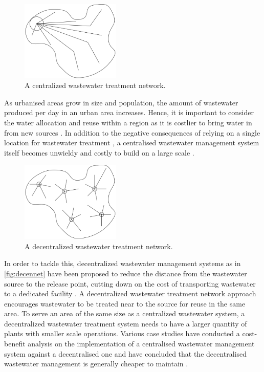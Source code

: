 \documentclass[preprint,12pt,authoryear]{elsarticle}
\begin{document}
\begin{figure}
	\begin{center}
		\includegraphics[width=0.42\textwidth]{centralizedtreatment.png}
	\end{center}
		\caption{A centralized wastewater treatment network.}
		\label{fig:cennet}
\end{figure}%
As urbanised areas grow in size and population, the amount of wastewater produced per day in an urban area increases. Hence, it is important to consider the water allocation and reuse within a region as it is costlier to bring water in from new sources \citep{gleick2000}. In addition to the negative consequences of relying on a single location for wastewater treatment \citep{wilderer2000,bakir2001}, a centralised wastewater management system itself becomes unwieldy and costly to build on a large scale \citep{wilderer2000}.


\begin{figure}
	\begin{center}
		\includegraphics[width=0.42\textwidth]{decentralizedtreatment.png}
	\end{center}
		\caption{A decentralized wastewater treatment network.}
		\label{fig:decennet}
\end{figure}
In order to tackle this, decentralized wastewater management systems as in \autoref{fig:decennet} have been proposed to reduce the distance from the wastewater source to the release point, cutting down on the cost of transporting wastewater to a dedicated facility \citep{otterpohl1997,wilderer2000,bakir2001}. A decentralized wastewater treatment network approach encourages wastewater to be treated near to the source for reuse in the same area. To serve an area of the same size as a centralized wastewater system, a decentralized wastewater treatment system needs to have a larger quantity of plants with smaller scale operations. Various case studies have conducted a cost-benefit analysis on the implementation of a centralised wastewater management system against a decentralised one and have concluded that the decentralised wastewater management is generally cheaper to maintain \citep{prihandrijanti2008,mawss2015}. 
\end{document}
